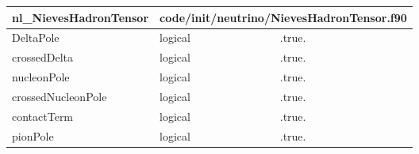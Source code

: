 \documentclass{article}
\begin{document}
\begin{longtable}{llll}
\toprule
\textbf{\large{nl\_NievesHadronTensor}} & \multicolumn{3}{l}{\footnotesize{code/init/neutrino/NievesHadronTensor.f90}}\\*
\midrule
\endfirsthead
\midrule
\endhead
DeltaPole & \begin{minipage}[t]{2cm}logical\end{minipage} & \begin{minipage}[t]{2cm}.true.\end{minipage} & \begin{minipage}[t]{12cm}\end{minipage}\\*
\midrule
crossedDelta & \begin{minipage}[t]{2cm}logical\end{minipage} & \begin{minipage}[t]{2cm}.true.\end{minipage} & \begin{minipage}[t]{12cm}\end{minipage}\\*
\midrule
nucleonPole & \begin{minipage}[t]{2cm}logical\end{minipage} & \begin{minipage}[t]{2cm}.true.\end{minipage} & \begin{minipage}[t]{12cm}\end{minipage}\\*
\midrule
crossedNucleonPole & \begin{minipage}[t]{2cm}logical\end{minipage} & \begin{minipage}[t]{2cm}.true.\end{minipage} & \begin{minipage}[t]{12cm}\end{minipage}\\*
\midrule
contactTerm & \begin{minipage}[t]{2cm}logical\end{minipage} & \begin{minipage}[t]{2cm}.true.\end{minipage} & \begin{minipage}[t]{12cm}\end{minipage}\\*
\midrule
pionPole & \begin{minipage}[t]{2cm}logical\end{minipage} & \begin{minipage}[t]{2cm}.true.\end{minipage} & \begin{minipage}[t]{12cm}\end{minipage}\\*

\end{longtable}
\end{document}
